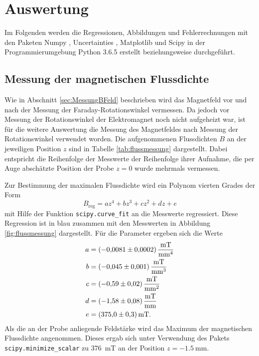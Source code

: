 \newpage
\section{Auswertung}
\label{sec:Auswertung}

Im Folgenden werden die Regressionen, Abbildungen und Fehlerrechnungen mit den
Paketen Numpy \cite{numpy}, Uncertainties \cite{uncertainties}, Matplotlib
\cite{matplotlib} und Scipy \cite{scipy} in der Programmierumgebung
Python 3.6.5 erstellt beziehungsweise durchgeführt.

\subsection{Messung der magnetischen Flussdichte}
\label{sec:flussmessung}

Wie in Abschnitt \ref{sec:MessungBFeld} beschrieben wird das Magnetfeld
vor und nach der Messung der Faraday-Rotationswinkel vermessen.
Da jedoch vor Messung der Rotationswinkel der Elektromagnet noch nicht
aufgeheizt war, ist für die weitere Auswertung die Messung des Magnetfeldes
nach Messung der Rotationswinkel verwendet worden.
Die aufgenommenen Flussdichten $B$ an der jeweiligen Position $z$
sind in Tabelle \ref{tab:flussmessung} dargestellt.
Dabei entspricht die Reihenfolge der Messwerte der Reihenfolge ihrer
Aufnahme, die per Auge abschätzte Position der Probe $z = 0$ wurde
mehrmals vermessen.



Zur Bestimmung der maximalen Flussdichte wird ein Polynom vierten Grades
der Form
\begin{equation*}
  B_\text{reg} = a z^4 + b z^3 + c z^2 + d z + e
  \label{eqn:feldfit}
\end{equation*}
mit Hilfe der Funktion \texttt{scipy.curve\_fit} an die Messwerte regressiert.
Diese Regression ist in blau zusammen mit den Messwerten in Abbildung
\ref{fig:flussmessung} dargestellt. Für die Parameter ergeben sich die Werte
\begin{align*}
  a &= \SI{-0.0081(2)}{\milli\tesla\per\raiseto{4}\milli\meter} \\
  b &= \SI{-0.045(1)}{\milli\tesla\per\raiseto{3}\milli\meter} \\
  c &= \SI{-0.59(2)}{\milli\tesla\per\raiseto{2}\milli\meter} \\
  d &= \SI{-1.58(8)}{\milli\tesla\per\raiseto{1}\milli\meter} \\
  e &= \SI{375.0(3)}{\milli\tesla}.
\end{align*}
Als die an der Probe anliegende Feldstärke wird das Maximum der magnetischen
Flussdichte angenommen. Dieses ergab sich unter Verwendung des Pakets
\texttt{scipy.minimize\_scalar} zu
\SI{376}{\milli\tesla} an der Position $z = \SI{-1.5}{\milli\meter}$.

